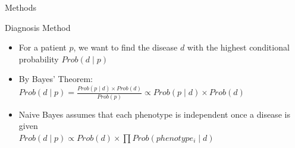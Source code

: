 \documentclass[final]{beamer} %
\begin{document}
\begin{frame}{}
\begin{columns}[T]
\begin{column}{0.3\linewidth}
\begin{block}{\Huge Methods}
\begin{block}{\LARGE Diagnosis Method}
\begin{itemize}
     \begin{itemize}
        \Large
    \item
    For a patient $p$, we want to find the disease $d$ with the highest conditional probability $Prob(d \mid p )$
  \vspace{1cm}
  \item
   By Bayes' Theorem: \\
   $Prob(d \mid p) = \frac{Prob(p \mid d) \times Prob(d)}{Prob(p)} \propto Prob(p \mid d) \times Prob(d)$
  \vspace{1cm}
   \item
   Naive Bayes assumes that each phenotype is independent once a disease is given \\
   $Prob(d \mid p) \propto Prob(d) \times \prod Prob(phenotype_i \mid d)$
     \end{itemize}
    \vspace{3cm}


\end{itemize}
\end{block}
\end{block}
\end{column}
\end{columns}
\end{frame}
\end{document}
